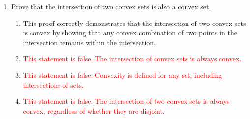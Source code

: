 \documentclass{article}%
\newcommand{\incorrect}[1]{\textcolor{red}{#1}}
\begin{document}
\begin{enumerate}
\begin{enumerate}
\begin{enumerate}
\item \incorrect{This is incorrect. The convex hull is defined for any set $S$, whether convex or not. If $S$ is already convex, then Conv($S$) = $S$.}%
\end{enumerate}%
\vspace{0.5em}%
\item Using Caratheodory's Theorem, explain why any point in the convex hull of a set $S$ in $\mathbb{R}^m$ can be expressed as a convex combination of at most $m+1$ points from $S$.%
\begin{enumerate}%
\item \incorrect{While Caratheodory's Theorem states the result, it's crucial to understand the underlying reasoning.}%
\item This option correctly identifies the core idea of the proof of Caratheodory's Theorem, which involves formulating a linear program to find a convex combination representing a given point in the convex hull. The optimal solution of this LP, due to its structure, will involve at most $m+1$ points.%
\item \incorrect{The Separation Theorem is a different result in convex analysis and is not directly involved in proving Caratheodory's Theorem.}%
\item \incorrect{This is incorrect. Caratheodory's Theorem applies to any set $S$, regardless of whether it is finite or infinite.}%
\item \incorrect{This is incorrect. Caratheodory's Theorem applies to any set $S$, whether it is convex or not. The convex hull is defined for any set.}%
\end{enumerate}%
\vspace{0.5em}%
\end{enumerate}%
\item Prove that the intersection of two convex sets is also a convex set.%
\begin{enumerate}%
\item This proof correctly demonstrates that the intersection of two convex sets is convex by showing that any convex combination of two points in the intersection remains within the intersection.%
\item \incorrect{This statement is false. The intersection of convex sets is always convex.}%
\item \incorrect{This statement is false.  Convexity is defined for any set, including intersections of sets.}%
\item \incorrect{This statement is false. The intersection of two convex sets is always convex, regardless of whether they are disjoint.}%

\end{enumerate}
\end{enumerate}
\end{document}
